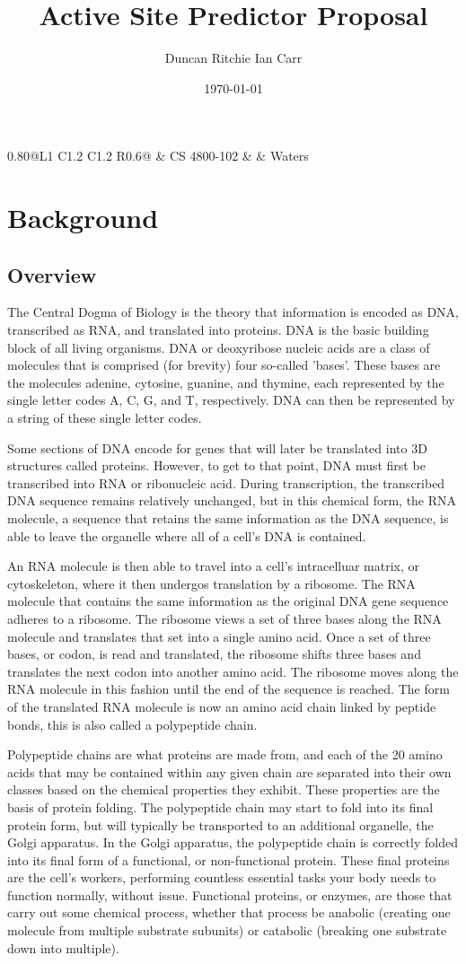 \documentclass[12pt]{article}
\title{Active Site Predictor Proposal}
\author{Duncan Ritchie Ian Carr}
\date{\today}
\makeatletter
\newcommand{\mytitle} {
	\begin{center}
		\LARGE\bfseries\@title
	\end{center}

	\begin{center}
		\begin{tabularx}{0.80\textwidth}{@{}L{1} C{1.2} C{1.2} R{0.6}@{}}
			\@author & CS 4800-102 & \@date & Waters
		\end{tabularx}
	\end{center}
}
\makeatother
\begin{document}
	\mytitle

	\section*{Background}

		\subsection*{Overview}

		The Central Dogma of Biology is the theory that information is encoded as
		DNA, transcribed as RNA, and translated into proteins. DNA is the basic
		building block of all living organisms. DNA or deoxyribose nucleic acids 
		are a class of molecules that is comprised (for brevity) four so-called 
		'bases'. These bases are the molecules adenine, cytosine, guanine, and 
		thymine, each represented by the single letter codes A, C, G, and T,
		respectively. DNA can then be represented by a string of these single 
		letter codes. 

		Some sections of DNA encode for genes that will later be translated into
		3D structures called proteins. However, to get to that point, DNA must 
		first be transcribed into RNA or ribonucleic acid. During transcription,
		the transcribed DNA sequence remains relatively unchanged, but in this
		chemical form, the RNA molecule, a sequence that retains the same
		information as the DNA sequence, is able to leave the organelle where
		all of a cell's DNA is contained.

		An RNA molecule is then able to travel into a cell's intracelluar matrix,
		or cytoskeleton, where it then undergos translation by a ribosome. The
		RNA molecule that contains the same information as the original DNA gene
		sequence adheres to a ribosome. The ribosome views a set of three bases
		along the RNA molecule and translates that set into a single amino acid.
		Once a set of three bases, or codon, is read and translated, the ribosome
		shifts three bases and translates the next codon into another amino 
		acid. The ribosome moves along the RNA molecule in this fashion until
		the end of the sequence is reached. The form of the translated RNA molecule
		is now an amino acid chain linked by peptide bonds, this is also called a
		polypeptide chain.

		Polypeptide chains are what proteins are made from, and each of the 20 
		amino acids that may be contained within any given chain are separated
		into their own classes based on the chemical properties they exhibit.
		These properties are the basis of protein folding. The polypeptide chain
		may start to fold into its final protein form, but will typically be
		transported to an additional organelle, the Golgi apparatus. In the Golgi
		apparatus, the polypeptide chain is correctly folded into its final form
		of a functional, or non-functional protein. These final proteins are
		the cell's workers, performing countless essential tasks your body
		needs to function normally, without issue. Functional proteins, or
		enzymes, are those that carry out some chemical process, whether that
		process be anabolic (creating one molecule from multiple substrate 
		subunits) or catabolic (breaking one substrate down into multiple).
\end{document}
